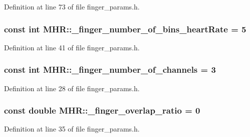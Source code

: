 Definition at line 73 of file finger\+\_\+params.\+h.

\hypertarget{namespace_m_h_r_a2762706b15a5accb61b7efa79cd0617a}{
\subsubsection[{\+\_\+finger\+\_\+number\+\_\+of\+\_\+bins\+\_\+heart\+Rate}]{\setlength{\rightskip}{0pt plus 5cm}const int M\+H\+R\+::\+\_\+finger\+\_\+number\+\_\+of\+\_\+bins\+\_\+heart\+Rate = 5}}\label{namespace_m_h_r_a2762706b15a5accb61b7efa79cd0617a}


Definition at line 41 of file finger\+\_\+params.\+h.

\hypertarget{namespace_m_h_r_aa01f8308d2cb5cdb00c4a45de8a8cd5e}{
\subsubsection[{\+\_\+finger\+\_\+number\+\_\+of\+\_\+channels}]{\setlength{\rightskip}{0pt plus 5cm}const int M\+H\+R\+::\+\_\+finger\+\_\+number\+\_\+of\+\_\+channels = 3}}\label{namespace_m_h_r_aa01f8308d2cb5cdb00c4a45de8a8cd5e}


Definition at line 28 of file finger\+\_\+params.\+h.

\hypertarget{namespace_m_h_r_a6ab2b5eaa5246621b9039b65e5501f1c}{
\subsubsection[{\+\_\+finger\+\_\+overlap\+\_\+ratio}]{\setlength{\rightskip}{0pt plus 5cm}const double M\+H\+R\+::\+\_\+finger\+\_\+overlap\+\_\+ratio = 0}}\label{namespace_m_h_r_a6ab2b5eaa5246621b9039b65e5501f1c}


Definition at line 35 of file finger\+\_\+params.\+h.

